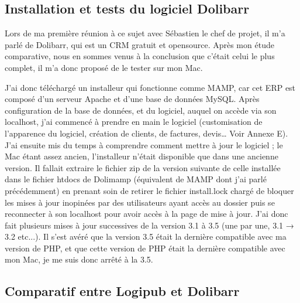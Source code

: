 \documentclass[report]{tnreport}
\begin{document}
\subsection{Installation et tests du logiciel Dolibarr}

Lors de ma première réunion à ce sujet avec Sébastien le chef de projet, il m’a parlé de Dolibarr, qui est un CRM gratuit et opensource. Après mon étude comparative, nous en sommes venus à la conclusion que c’était celui le plus complet, il m’a donc proposé de le tester sur mon Mac.


J’ai donc téléchargé un installeur qui fonctionne comme MAMP, car cet ERP est composé d’un serveur Apache et d’une base de données MySQL. Après configuration de la base de données, et du logiciel, auquel on accède via son localhost, j’ai commencé à prendre en main le logiciel (customisation de l’apparence du logiciel, création de clients, de factures, devis… Voir Annexe E). J’ai ensuite mis du temps à comprendre comment mettre à jour le logiciel ; le Mac étant assez ancien, l’installeur n’était disponible que dans une ancienne version. Il fallait extraire le fichier zip de la version suivante de celle installée dans le fichier htdocs de Dolimamp (équivalent de MAMP dont j’ai parlé précédemment) en prenant soin de retirer le fichier install.lock chargé de bloquer les mises à jour inopinées par des utilisateurs ayant accès au dossier puis se reconnecter à son localhost pour avoir accès à la page de mise à jour. J’ai donc fait plusieurs mises à jour successives de la version 3.1 à 3.5 (une par une, 3.1 → 3.2 etc...). Il s’est avéré que la version 3.5 était la dernière compatible avec ma version de PHP, et que cette version de PHP était la dernière compatible avec mon Mac, je me suis donc arrêté à la 3.5.


\subsection{Comparatif entre Logipub et Dolibarr}
\end{document}
